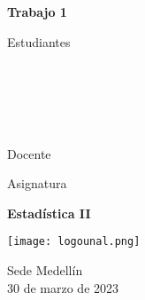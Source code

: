 \begin{titlepage}
   \Large{
   \begin{center}
       \vspace*{1cm}

       \textbf{Trabajo 1}

            
       \vspace{1.5cm}
       
       Estudiantes
       
       \vspace{0.5cm}
        
	\textbf{}\\    

  \textbf{}\\

	\textbf{}\\

	\textbf{}\\

              \vspace{1cm}
       
       Docente
       
       \vspace{0.5cm}

       \textbf{}
       
       \vspace{0.4cm}

       \vspace{1.4cm}
       
       Asignatura
       
       \vspace{0.5cm}

       \textbf{Estadística II}

       \vfill

            
       \vspace{0.4cm}
     
       \texttt{[image: logounal.png]}
            
       Sede Medellín\\
       30 de marzo de 2023
       
   \end{center}
   }
\end{titlepage}